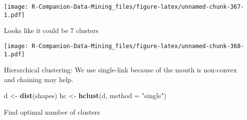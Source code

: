 \documentclass[
  notitlepage]{book}
\newenvironment{Shaded}{\begin{snugshade}}{\end{snugshade}}
\newcommand{\ControlFlowTok}[1]{\textcolor[rgb]{0.13,0.29,0.53}{\textbf{#1}}}
\newcommand{\DataTypeTok}[1]{\textcolor[rgb]{0.13,0.29,0.53}{#1}}
\newcommand{\DecValTok}[1]{\textcolor[rgb]{0.00,0.00,0.81}{#1}}
\newcommand{\ErrorTok}[1]{\textcolor[rgb]{0.64,0.00,0.00}{\textbf{#1}}}
\newcommand{\KeywordTok}[1]{\textcolor[rgb]{0.13,0.29,0.53}{\textbf{#1}}}
\newcommand{\NormalTok}[1]{#1}
\newcommand{\OperatorTok}[1]{\textcolor[rgb]{0.81,0.36,0.00}{\textbf{#1}}}
\newcommand{\StringTok}[1]{\textcolor[rgb]{0.31,0.60,0.02}{#1}}
\begin{document}
\texttt{[image: R-Companion-Data-Mining\_files/figure-latex/unnamed-chunk-367-1.pdf]}

Looks like it could be 7 clusters

\begin{Shaded}
\end{Shaded}

\texttt{[image: R-Companion-Data-Mining\_files/figure-latex/unnamed-chunk-368-1.pdf]}

Hierarchical clustering: We use single-link because of the mouth is
non-convex and chaining may help.

\begin{Shaded}
\begin{Highlighting}[]
\NormalTok{d \textless{}{-}}\StringTok{ }\KeywordTok{dist}\NormalTok{(shapes)}
\NormalTok{hc \textless{}{-}}\StringTok{ }\KeywordTok{hclust}\NormalTok{(d, }\DataTypeTok{method =} \StringTok{"single"}\NormalTok{)}
\end{Highlighting}
\end{Shaded}

Find optimal number of clusters

\begin{Shaded}
\end{Shaded}
\end{document}
